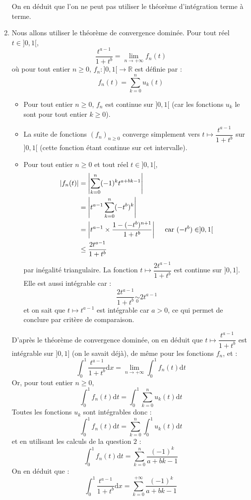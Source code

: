 \documentclass[a4paper,twoside,french,10pt]{VcCours}
\newcommand{\dx}{\text{d}x}
\newcommand{\dt}{\text{d}t}
\begin{document}
\begin{enumerate}
\noindent On en déduit que l'on ne peut pas utiliser le théorème d'intégration terme à terme.
\item Nous allons utiliser le théorème de convergence dominée. Pour tout réel $t \in ]0,1[$,
$$ \dfrac{t^{a-1}}{1+t^b} = \lim_{n \rightarrow + \infty} f_n(t)$$
où pour tout entier $n \geq 0$, $f_n : ]0,1[ \rightarrow \mathbb{R}$ est définie par :
$$ f_n(t) = \sum_{k=0}^n u_k(t) $$
\begin{itemize}
\item Pour tout entier $n \geq 0$, $f_n$ est continue sur $]0,1[$ (car les fonctions $u_k$ le sont pour tout entier $k \geq 0$).
\item La suite de fonctions $(f_n)_{n \geq 0}$ converge simplement vers $t \mapsto \dfrac{t^{a-1}}{1+t^b}$ sur $]0,1[$ (cette fonction étant continue sur cet intervalle).
\item Pour tout entier $n \geq 0$ et tout réel $t \in ]0,1[$,
\begin{align*}
\vert f_n(t) \vert & = \left\vert \sum_{k=0}^n (-1)^k t^{a+bk-1} \right\vert \\
& =   \left\vert t^{a-1} \sum_{k=0}^n (-t^b)^k  \right\vert \\
& = \left\vert t^{a-1} \times \dfrac{1-(-t^b)^{n+1}}{1+t^b} \right\vert \quad \hbox{ car } (-t^b) \in ]0,1[ \\
& \leq \dfrac{2 t^{a-1}}{1+t^b}
\end{align*}
par inégalité triangulaire. La fonction $t \mapsto \dfrac{2 t^{a-1}}{1+t^b}$ est continue sur $]0,1]$. Elle est aussi intégrable car :
$$ \dfrac{2 t^{a-1}}{1+t^b} \underset{0}{\sim} 2 t^{a-1}$$
et on sait que $t \mapsto t^{a-1}$ est intégrable car $a>0$, ce qui permet de conclure par critère de comparaison.
\end{itemize}
D'après le théorème de convergence dominée, on en déduit que $t \mapsto \dfrac{t^{a-1}}{1+t^b}$ est intégrable sur $]0,1]$ (on le savait déjà), de même pour les fonctions $f_n$, et :
$$ \int_0^1 \dfrac{t^{a-1}}{1+t^b} \dx = \lim_{n \rightarrow + \infty} \int_0^1 f_n(t) \dt$$
Or, pour tout entier $n \geq 0$,
$$ \int_0^1 f_n(t) \dt = \int_0^1 \sum_{k=0}^n u_k(t) \dt $$
Toutes les fonctions $u_k$ sont intégrables donc :
$$  \int_0^1 f_n(t) \dt = \sum_{k=0}^n \int_0^1  u_k(t) \dt $$
et en utilisant les calculs de la question $2$ :
$$  \int_0^1 f_n(t) \dt = \sum_{k=0}^n \dfrac{(-1)^k}{a+bk-1}$$
On en déduit que :
$$\int_0^1 \dfrac{t^{a-1}}{1+t^b} \dx =\sum_{k=0}^{+ \infty} \dfrac{(-1)^k}{a+bk-1}$$
 \end{enumerate}
 
\end{document}
